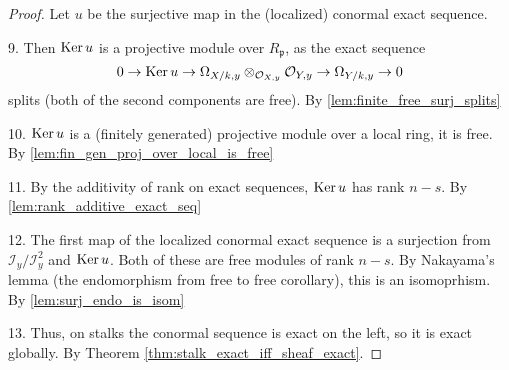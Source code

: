 \begin{proof}
  Let $u$ be the surjective map in the (localized) conormal exact sequence.

  9.  Then $\operatorname{Ker} u$ is a projective module over $R_{\mathfrak{p}}$, as
      the exact sequence
      \[
        0 \to \operatorname{Ker} u \to 
        \Omega_{X/k,y} \otimes_{\mathcal{O}_{X,y}} \mathcal{O}_{Y,y} 
        \to
        \Omega_{Y/k,y} 
        \to 0
      \]
      splits (both of the second components are free).
      By \ref{lem:finite_free_surj_splits}

  10. $\operatorname{Ker} u$ is a (finitely generated) projective module over a local ring, it is free.
      By \ref{lem:fin_gen_proj_over_local_is_free}
      
  11. By the additivity of rank on exact sequences, $\operatorname{Ker} u$ has rank $n-s$.
      By \ref{lem:rank_additive_exact_seq}

  12. The first map of the localized conormal exact sequence is a surjection from
      $\mathcal{I}_y / \mathcal{I}^2_y$ and $\operatorname{Ker} u$. 
      Both of these are free modules of rank $n-s$. 
      By Nakayama's lemma (the endomorphism from free to free corollary),
      this is an isomoprhism.
      By \ref{lem:surj_endo_is_isom}

  13. Thus, on stalks the conormal sequence is exact on the left, so it is 
      exact globally.
      By Theorem \ref{thm:stalk_exact_iff_sheaf_exact}.
\end{proof}

